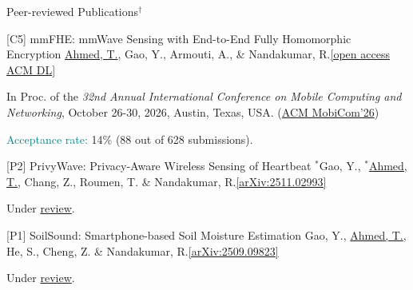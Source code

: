 \documentclass{resume} %
\begin{document}
\begin{rSection}{Peer-reviewed Publications$^\dagger$}


\begin{rPublicationSubsection}{[C5] mmFHE: mmWave Sensing with End-to-End Fully Homomorphic Encryption}{}
{\underline{Ahmed, T.}, Gao, Y., Armouti, A., \& Nandakumar, R.}{\href{https://dl.acm.org/doi/10.1145/3795866.3844486}{[open access ACM DL]}}
\item In Proc. of the \textit{32nd Annual International Conference on Mobile Computing and Networking}, October 26-30, 2026, Austin, Texas, USA. (\href{https://www.sigmobile.org/mobicom/2026/}{ACM MobiCom'26}) \label{pub:P3}
\item \textcolor{teal}{Acceptance rate:} 14\% (88 out of 628 submissions).
 
\end{rPublicationSubsection}

\begin{rPublicationSubsection}{[P2] PrivyWave: Privacy-Aware Wireless Sensing of Heartbeat}{}
{$^*$Gao, Y., $^*$\underline{Ahmed, T.}, Chang, Z., Roumen, T. \& Nandakumar, R.}{\href{https://arxiv.org/abs/2511.02993}{[arXiv:2511.02993]}}
\item Under \underline{review}. \label{pub:P2}

\end{rPublicationSubsection}

\begin{rPublicationSubsection}{[P1] SoilSound: Smartphone-based Soil Moisture Estimation}{}
{Gao, Y., \underline{Ahmed, T.}, He, S., Cheng, Z. \& Nandakumar, R.}{\href{https://arxiv.org/abs/2509.09823}{[arXiv:2509.09823]}}
\item Under \underline{review}.
 
\end{rPublicationSubsection}


\end{rSection}
\end{document}
